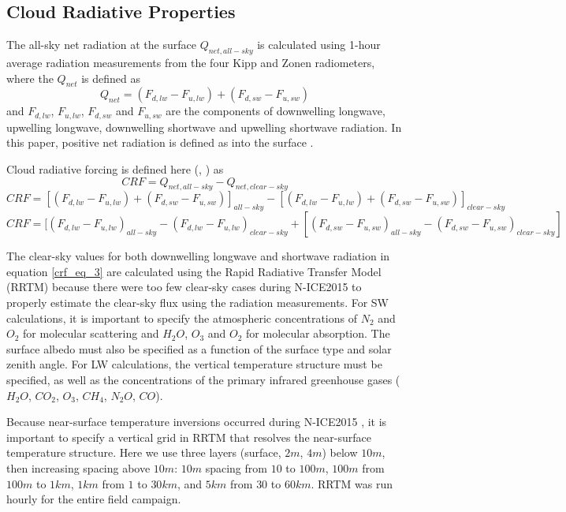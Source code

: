 \subsection{Cloud Radiative Properties}

The all-sky net radiation at the surface $Q_{net, all-sky}$ is calculated using 1-hour average radiation measurements from the four Kipp and Zonen radiometers, where the $Q_{net}$ is defined as
\begin{equation}\label{qnet}
Q_{net} = (F_{d,lw} - F_{u,lw}) + (F_{d,sw} - F_{u,sw})
\end{equation}
and $F_{d,lw}$, $F_{u,lw}$, $F_{d,sw}$ and $F_{u,sw}$ are the components of downwelling longwave, upwelling longwave, downwelling shortwave and upwelling shortwave radiation. In this paper, positive net radiation is defined as into the surface \cite{miller:2015}.

Cloud radiative forcing is defined here (\cite{ramanathan:1989}, \cite{miller:2015}) as 
\begin{equation}\label{crf_eq}
CRF = Q_{net, all-sky} - Q_{net, clear-sky}
\end{equation}
\begin{equation}\label{crf_eq_2}
CRF = [(F_{d,lw} - F_{u,lw}) + (F_{d,sw} - F_{u,sw})]_{all-sky} - [(F_{d,lw} - F_{u,lw}) + (F_{d,sw} - F_{u,sw})]_{clear-sky}
\end{equation}
\begin{equation}\label{crf_eq_3}
CRF = [(F_{d,lw} - F_{u,lw})_{all-sky} - (F_{d,lw} - F_{u,lw})_{clear-sky}
+ [(F_{d,sw} - F_{u,sw})_{all-sky} -  (F_{d,sw} - F_{u,sw})_{clear-sky}]
\end{equation}

The clear-sky values for both downwelling longwave and shortwave radiation in equation \ref{crf_eq_3} are calculated using the Rapid Radiative Transfer Model (RRTM) \cite{mlawer:1997} because there were too few clear-sky cases during N-ICE2015 to properly estimate the clear-sky flux using the radiation measurements. For SW calculations, it is important to specify the atmospheric concentrations of $N_{2}$ and $O_{2}$ for molecular scattering and $H_{2}O$, $O_{3}$ and $O_{2}$ for molecular absorption. The surface albedo must also be specified as a function of the surface type and solar zenith angle. For LW calculations, the vertical temperature structure must be specified, as well as the concentrations of the primary infrared greenhouse gases ($H_{2}O$, $CO_{2}$, $O_{3}$, $CH_{4}$, $N_{2}O$, $CO$).

Because near-surface temperature inversions occurred during N-ICE2015 \cite{kayser:2017}, it is important to specify a vertical grid in RRTM that resolves the near-surface temperature structure. Here we use three layers (surface, $2 m$, $4 m$) below $10 m$, then increasing spacing above $10 m$: $10 m$ spacing from $10$ to $100 m$, $100 m$ from $100 m$ to $1 km$, $1 km$ from $1$ to $30 km$, and $5 km$ from $30$ to $60 km$. RRTM was run hourly for the entire field campaign.

